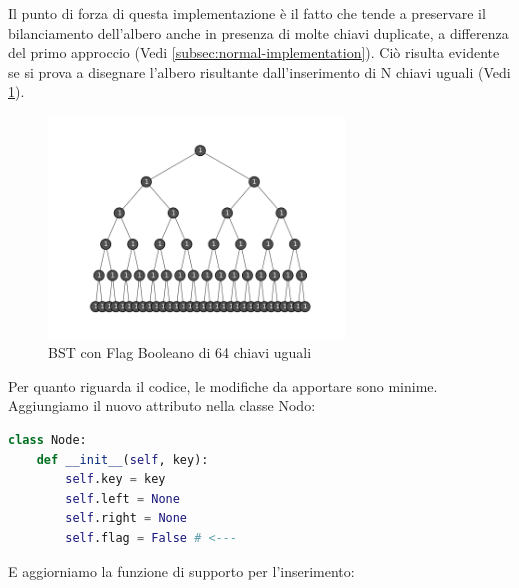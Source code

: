 \documentclass{article}
\begin{document}
Il punto di forza di questa implementazione è il fatto che tende a preservare il bilanciamento dell'albero anche in presenza di molte chiavi duplicate, a differenza del primo approccio (Vedi \ref{subsec:normal-implementation}). Ciò risulta evidente se si prova a disegnare l'albero risultante dall'inserimento di N chiavi uguali (Vedi \cref{fig:bst-flag}).



\begin{figure}[H]
  \centering
  \includegraphics[width=0.7\textwidth]{./images/bst-flag}
  \caption{BST con Flag Booleano di 64 chiavi uguali}
  \label{fig:bst-flag}
\end{figure}



Per quanto riguarda il codice, le modifiche da apportare sono minime.
Aggiungiamo il nuovo attributo nella classe Nodo:

\begin{lstlisting}[language=Python, caption={Classe nodo di un BST con Flag Booleano}]
class Node:
    def __init__(self, key):
        self.key = key
        self.left = None
        self.right = None
        self.flag = False # <---
\end{lstlisting}

E aggiorniamo la funzione di supporto per l'inserimento:
\end{document}
